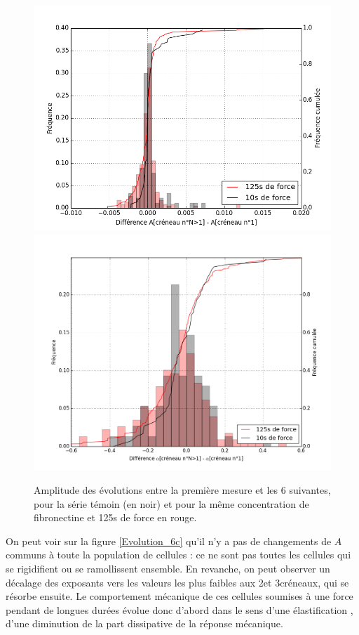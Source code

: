 \begin{figure}
\includegraphics[scale=0.3]{Figures/A_diff.png} 
\includegraphics[scale=0.3]{Figures/E_diff.png}
\caption{Amplitude des évolutions entre la première mesure et les 6 suivantes, pour la série  témoin (en noir) et pour la même concentration de fibronectine et 125s de force en rouge.}
\label{Diff}

 
\end{figure}
On peut voir sur la figure \ref{Evolution_6c} qu'il n'y a pas de changements de $A$ communs à toute la population de cellules : ce ne sont pas toutes les cellules qui se rigidifient ou se ramollissent ensemble. 
En revanche, on peut observer un décalage des exposants vers les valeurs les plus faibles aux 2\ieme  et 3\ieme créneaux, qui se résorbe ensuite. 
Le comportement mécanique de ces cellules soumises à une force pendant de longues durées évolue donc d'abord dans le sens d'une \og élastification \fg , d'une diminution de la part dissipative de la réponse mécanique. 

